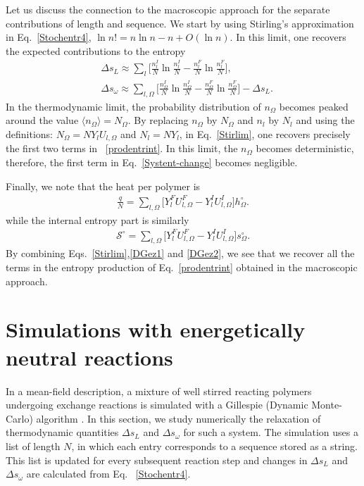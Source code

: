 \documentclass[
	amsmath,
	amssymb,
	a4paper,
	aip,		%
	jcp,		%
	reprint, twocolumn  %
	fleqn,
	showpacs,
	floatfix
]{revtex4-1}
\begin{document}
Let us discuss the connection to the macroscopic approach for the separate contributions of length and sequence.
We start by using Stirling's approximation in Eq.~\eqref{Stochentr4}, 
$\ln n!=n \ln n - n + O( \ln n)$. In this limit, one recovers the expected contributions to the entropy
 \begin{equation}
	\begin{split}
&\Delta s_{L} \approx 
\sum_{l} \bigg[ \frac{n^{I}_{l}}{N} \ln  \frac{n^{I}_{l}}{N} -  \frac{n^{F}_{l}}{N} \ln  \frac{n^{F}_{l}}{N} \bigg] , \\
&\Delta s_{\omega}  \approx 
\sum_{l,\Omega} \bigg[ \frac{n^{I}_{\Omega}}{N}  \ln \frac{n^{I}_{\Omega}}{N} -  \frac{n^{F}_{\Omega}}{N} \ln \frac{n^{F}_{\Omega}}{N} \bigg] - \Delta s_L .
\label{Stirlim}
\end{split} 
\end{equation}
In the thermodynamic limit, the probability distribution of $n_{\Omega}$ becomes peaked around the 
value $\langle n_{\Omega} \rangle=N_\Omega$. By replacing
$n_\Omega$ by $N_\Omega$ and $n_l$ by $N_l$ and using the definitions: $N_\Omega=N Y_l U_{l,\Omega}$ and  $N_l=N Y_l$, in Eq.~\eqref{Stirlim}, 
one recovers precisely the first two terms in ~\eqref{prodentrint}.
In this limit, the $n_\Omega$ becomes deterministic, therefore, the first term in Eq.~\eqref{Systent-change} becomes negligible.

Finally, we note that the heat per polymer is
 \begin{equation}
	\begin{split}
\frac{q}{N} =  \sum_{l,\Omega} \Big[Y^{F}_l U^{F}_{l,\Omega}  -Y^{I}_l  U^{I}_{l,\Omega}   \Big] h^{\circ}_\Omega .
\label{DGez1}
\end{split} 
\end{equation}
while the internal entropy part is similarly
\begin{equation}
	\begin{split}
\mathcal{S}^{\circ} =  \sum_{l,\Omega} \Big[Y^{F}_l U^{F}_{l,\Omega}  -Y^{I}_l  U^{I}_{l,\Omega}   \Big] s^{\circ}_\Omega .
\label{DGez2}
\end{split} 
\end{equation}
By combining Eqs.~\eqref{Stirlim},\eqref{DGez1} and \eqref{DGez2}, we see that we recover all the terms in 
the entropy production of Eq.~\eqref{prodentrint} obtained in the macroscopic approach.

\section{Simulations with energetically neutral reactions}
\label{sec:simul_neutral}
In a mean-field description, a mixture of well stirred 
reacting polymers undergoing exchange reactions 
is simulated with a Gillespie (Dynamic Monte-Carlo) algorithm \citep{Gillespie1977_vol173}. 
In this section, we study numerically the relaxation of thermodynamic quantities $\Delta s_L$ and $\Delta s_{\omega}$ for such a system.
The simulation uses a list of length $N$, in which each entry corresponds to a sequence stored as a string. This list is updated
for every subsequent reaction step and changes in $\Delta s_L$ and $\Delta s_{\omega}$ are calculated from Eq. ~\eqref{Stochentr4}.  
\end{document}
